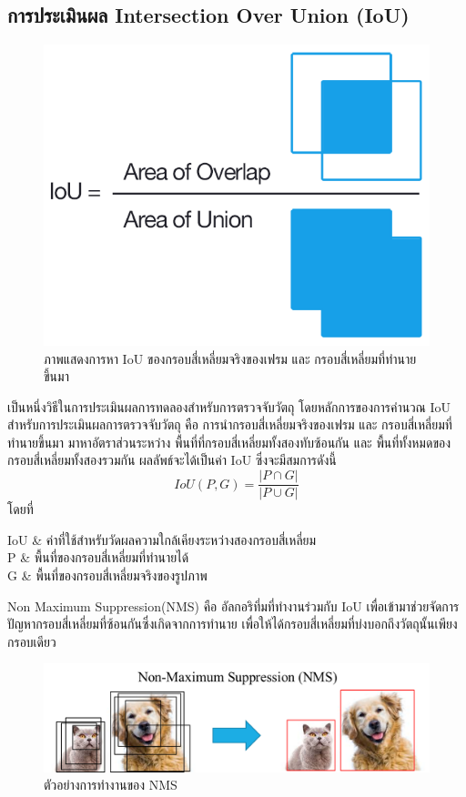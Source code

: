 \subsection*{การประเมินผล Intersection Over Union (IoU)}
\begin{figure}[!ht]
	\centering
	\includegraphics[scale=0.3]{chapter2/images/iou_equation.png}
		\caption{ภาพแสดงการหา IoU ของกรอบสี่เหลี่ยมจริงของเฟรม และ กรอบสี่เหลี่ยมที่ทำนายขึ้นมา}
    	\label{fig:iou_equation}
\end{figure}

เป็นหนึ่งวิธีในการประเมินผลการทดลองสำหรับการตรวจจับวัตถุ โดยหลักการของการคำนวณ IoU สำหรับการประเมินผลการตรวจจับวัตถุ คือ การนำกรอบสี่เหลี่ยมจริงของเฟรม และ กรอบสี่เหลี่ยมที่ทำนายขึ้นมา มาหาอัตราส่วนระหว่าง พื้นที่ที่กรอบสี่เหลี่ยมทั้งสองทับซ้อนกัน และ พื้นที่ทั้งหมดของกรอบสี่เหลี่ยมทั้งสองรวมกัน ผลลัพธ์จะได้เป็นค่า IoU ซึ่งจะมีสมการดังนี้
\begin{equation}
IoU(P,G) = \frac{\left| P \cap G \right|}{\left| P \cup  G \right|}					
\end{equation}
โดยที่
\begin{conditions}
IoU			&  ค่าที่ใช้สำหรับวัดผลความใกล้เคียงระหว่างสองกรอบสี่เหลี่ยม    \\
P			&  พื้นที่ของกรอบสี่เหลี่ยมที่ทำนายได้	\\
G			&  พื้นที่ของกรอบสี่เหลี่ยมจริงของรูปภาพ					\\
\end{conditions}
\par Non Maximum Suppression(NMS) คือ อัลกอริทึ่มที่ทำงานร่วมกับ IoU เพื่อเข้ามาช่วยจัดการปัญหากรอบสี่เหลี่ยมที่ซ้อนกันซึ่งเกิดจากการทำนาย เพื่อให้ได้กรอบสี่เหลี่ยมที่บ่งบอกถึงวัตถุนั้นเพียงกรอบเดียว 
\begin{figure}[!ht]
	\centering
	\includegraphics[scale=0.3]{chapter2/images/NMS.png}
		\caption{ตัวอย่างการทำงานของ NMS}
    	\label{fig:NMS}
\end{figure}
